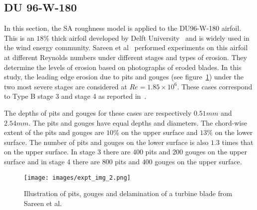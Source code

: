 \subsection{DU 96-W-180}
In this section, the SA roughness model is applied to the DU96-W-180 airfoil. This is an $18\%$ thick airfoil developed by Delft University~\cite{timmer2003summary} and is widely used in the wind energy community. Sareen et al~\cite{sareen2014effects} performed experiments on this airfoil at different Reynolds numbers under different stages and types of erosion. They determine the levels of erosion based on photographs of eroded blades. In this study, the leading edge erosion due to pits and gouges (see figure~\ref{fig:pitsandgouges}) under the two most severe stages are considered at $Re=1.85\times10^6$. These cases correspond to Type B stage 3 and stage 4 as reported in~\cite{sareen2014effects}. 

The depths of pits and gouges for these cases are respectively $0.51mm$ and $2.54mm$. The pits and gouges have equal depths and diameters. The chord-wise extent of the pits and gouges are $10\%$ on the upper surface and $13\%$ on the lower surface. The number of pits and gouges on the lower surface is also $1.3$ times that on the upper surface. In stage 3 there are $400$ pits and $200$ gouges on the upper surface and in stage 4 there are $800$ pits and $400$ gouges on the upper surface.
\begin{figure}[h!]
    \centering
    \captionsetup{justification=centering}
    \texttt{[image: images/expt\_img\_2.png]}
    \caption{Illustration of pits, gouges and delamination of a turbine blade from Sareen et al\cite{sareen2014effects}.}
    \label{fig:pitsandgouges}
\end{figure}

